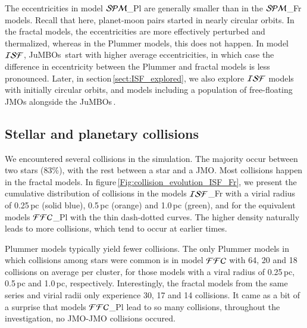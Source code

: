 \documentclass[submission,phys]{lib/SciPost}
\newcommand{\jumbos}{\mbox{JuMBOs}}
\begin{document}
The eccentricities in model ${\cal SPM}$\_Pl are generally smaller
than in the ${\cal SPM}$\_Fr models. Recall that here, planet-moon
pairs started in nearly circular orbits.  In the fractal models, the
eccentricities are more effectively perturbed and thermalized, whereas
in the Plummer models, this does not happen.  In model ${\cal ISF}$,
\jumbos\, start with higher average eccentricities, in which case the
difference in eccentricity between the Plummer and fractal models is
less pronounced. Later, in section\,\ref{sect:ISF_explored}, we also
explore ${\cal ISF}$ models with initially circular orbits, and models
including a population of free-floating JMOs alongside the \jumbos\,.

\subsection{Stellar and planetary collisions}\label{Sect:collisions}

We encountered several collisions in the simulation. The
majority occur between two stars (83\%), with the rest between a star
and a JMO. Most collisions happen in the fractal models.
In figure\,\ref{Fig:collision_evolution_ISF_Fr}, we present the
cumulative distribution of collisions in the models ${\cal ISF}$\_Fr
with a virial radius of 0.25\,pc (solid blue), 0.5\,pc (orange) and
1.0\,pc (green), and for the equivalent models ${\cal FFC}$\_Pl with the
thin dash-dotted curves.  The higher density naturally leads to more
collisions, which tend to occur at earlier times.  

Plummer models typically yield fewer collisions.  The only Plummer
models in which collisions among stars were common is in model ${\cal
  FFC}$ with 64, 20 and 18 collisions on average per cluster, for
those models with a viral radius of 0.25\,pc, 0.5\,pc and 1.0\,pc,
respectively.  Interestingly, the fractal models from the same series
and virial radii only experience 30, 17 and 14 collisions.  It came as
a bit of a surprise that models ${\cal FFC}$\_Pl lead to so many
collisions, throughout the investigation, no JMO-JMO collisions
occured.
\end{document}
